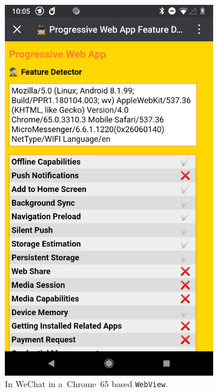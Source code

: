 \documentclass[sigconf]{acmart}
\begin{document}
\begin{figure}[h]
  \centering
  \begin{subfigure}[t]{0.475\columnwidth}
    \includegraphics[width=1\columnwidth,frame]{pwa-feature-detector-wechat-android-chrome65}
    \caption[\textsc{pwa} Feature Detector running in WeChat.]{
      In WeChat in a~Chrome~65 based \texttt{WebView}.}
    \label{fig:wechat-android-chrome65}
  \end{subfigure}    
  \quad
  \begin{subfigure}[t]{0.475\columnwidth}  

\end{subfigure}
\end{figure}
\end{document}
